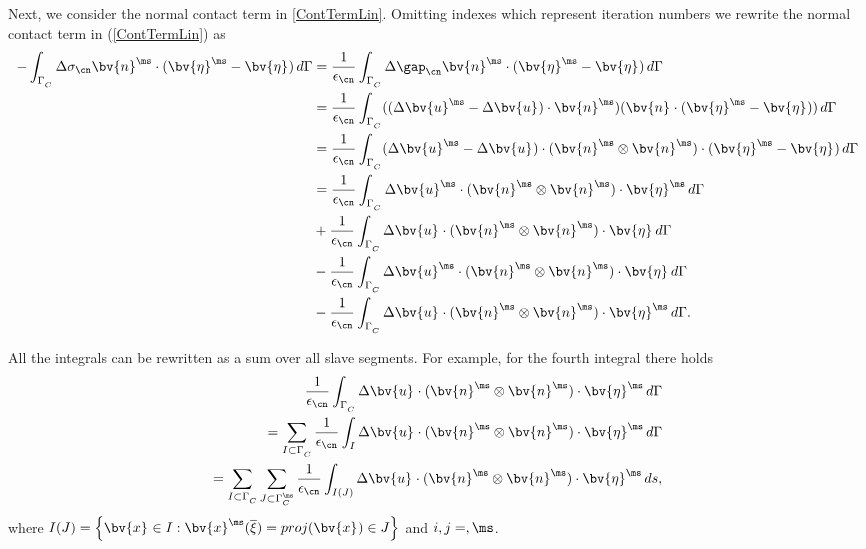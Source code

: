 
Next, we consider the normal contact term in  \ref{ContTermLin}. Omitting indexes which represent iteration numbers we rewrite the normal contact term in (\ref{ContTermLin}) as
\begin{align*}
-\int_{\Gamma^{\sl}_C} \Delta \sigma_{\cn} \bv{n}^{\ms} \cdot (\bv{\eta}^{\ms} - \bv{\eta}^{\sl}) \, d\Gamma 
&= {\frac{1}{\epsilon_{\cn}}} \int_{\Gamma^{\sl}_C} \Delta \gap_{\cn} \bv{n}^{\ms} \cdot (\bv{\eta}^{\ms} - \bv{\eta}^{\sl}) \, d\Gamma \\
&= {\frac{1}{\epsilon_{\cn}}} \int_{\Gamma^{\sl}_C} ((\Delta \bv{u}^{\ms} - \Delta \bv{u}^{\sl}) \cdot \bv{n}^{\ms}) (\bv{n}^{\sl} \cdot (\bv{\eta}^{\ms} - \bv{\eta}^{\sl})) \, d\Gamma \\
&= {\frac{1}{\epsilon_{\cn}}} \int_{\Gamma^{\sl}_C} (\Delta \bv{u}^{\ms} - \Delta \bv{u}^{\sl}) \cdot (\bv{n}^{\ms} \otimes \bv{n}^{\ms}) \cdot (\bv{\eta}^{\ms} - \bv{\eta}^{\sl}) \, d\Gamma \\
&= {\frac{1}{\epsilon_{\cn}}} \int_{\Gamma^{\sl}_C} \Delta \bv{u}^{\ms} \cdot (\bv{n}^{\ms} \otimes \bv{n}^{\ms}) \cdot \bv{\eta}^{\ms} \, d\Gamma \\
&+ {\frac{1}{\epsilon_{\cn}}} \int_{\Gamma^{\sl}_C} \Delta \bv{u}^{\sl} \cdot (\bv{n}^{\ms} \otimes \bv{n}^{\ms}) \cdot \bv{\eta}^{\sl} \, d\Gamma \\
&- {\frac{1}{\epsilon_{\cn}}} \int_{\Gamma^{\sl}_C} \Delta \bv{u}^{\ms} \cdot (\bv{n}^{\ms} \otimes \bv{n}^{\ms}) \cdot \bv{\eta}^{\sl} \, d\Gamma \\
&- {\frac{1}{\epsilon_{\cn}}} \int_{\Gamma^{\sl}_C} \Delta \bv{u}^{\sl} \cdot (\bv{n}^{\ms} \otimes \bv{n}^{\ms}) \cdot \bv{\eta}^{\ms} \, d\Gamma.
\end{align*}

All the integrals can be rewritten as a sum over all slave segments. For example, for the fourth integral there holds
\begin{align*}
{\frac{1}{\epsilon_{\cn}}} \int_{\Gamma^{\sl}_C} \Delta \bv{u}^{\sl} \cdot (\bv{n}^{\ms} \otimes \bv{n}^{\ms}) \cdot \bv{\eta}^{\ms} \, d\Gamma \\
= \sum_{I \subset \Gamma^{\sl}_C} 
{\frac{1}{\epsilon_{\cn}}} \int_{I} \Delta \bv{u}^{\sl} \cdot (\bv{n}^{\ms} \otimes \bv{n}^{\ms}) \cdot \bv{\eta}^{\ms} \, d\Gamma \\
= \sum_{I \subset \Gamma^{\sl}_C} \sum_{J \subset \Gamma^{\ms}_C}
{\frac{1}{\epsilon_{\cn}}} \int_{I(J)} \Delta \bv{u}^{\sl} \cdot (\bv{n}^{\ms} \otimes \bv{n}^{\ms}) \cdot \bv{\eta}^{\ms} \, ds,
\end{align*}
where $I(J) = \left\lbrace \bv{x}^{\sl} \in I: \bv{x}^{\ms}(\overline{\xi}) = proj (\bv{x}^{\sl}) \in J \right\rbrace $ and $i,j = \sl,\ms$.

